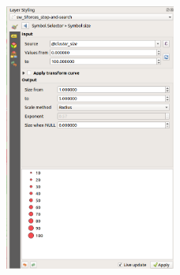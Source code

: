 \begin{figure}[!h]
	\centering
	\includegraphics[width=0.5\textwidth]{images/point_clustering_cluster_size.png}
	\caption{}
	\label{ft_fig_firstfig3}
\end{figure}
